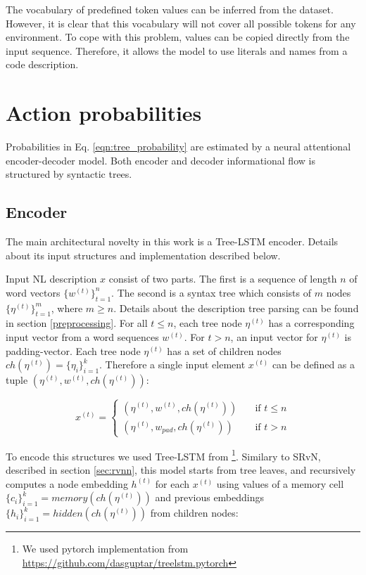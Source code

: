 The vocabulary of predefined token values can be inferred from the dataset. However, it is clear that this vocabulary will not cover all possible tokens for any environment. To cope with this problem, values can be copied directly from the input sequence. Therefore, it allows the model to use literals and names from a code description.

\section{Action probabilities}
Probabilities in Eq. \ref{eqn:tree_probability} are estimated by a neural attentional encoder-decoder model. Both encoder and decoder informational flow is structured by syntactic trees. 

\subsection{Encoder}
The main architectural novelty in this work is a Tree-LSTM encoder. Details about its input structures and implementation described below.

Input NL description $x$ consist of two parts. The first is a sequence of length $n$ of word vectors $\{w^{(t)}\}^n_{t=1}$. The second is a syntax tree which consists of $m$ nodes $\{\eta^{(t)}\}^m_{t=1}$, where $m\geq n$. Details about the description tree parsing can be found in section \ref{preprocessing}. For all $t \leq n$, each tree node $\eta^{(t)}$ has a corresponding input vector from a word sequences $w^{(t)}$. For $t > n$, an input vector for $\eta^{(t)}$ is padding-vector. Each tree node $\eta^{(t)}$ has a set of children nodes $ch(\eta^{(t)})=\{\eta_{i}\}^k_{i=1}$. Therefore a single input element $x^{(t)}$ can be defined as a tuple $(\eta^{(t)}, w^{(t)}, ch(\eta^{(t)}))$:

\begin{equation}
 x^{(t)} =
  \begin{cases}
    (\eta^{(t)}, w^{(t)}, ch(\eta^{(t)}))  & \quad \text{if } t\leq n\\
    (\eta^{(t)}, w_{pad}, ch(\eta^{(t)}))  & \quad \text{if } t > n
  \end{cases}
\label{eq:enc_input}
\end{equation}

To encode this structures we used Tree-LSTM from \cite{Tai2015}\footnote{We used pytorch implementation from \href{https://github.com/dasguptar/treelstm.pytorch}{https://github.com/dasguptar/treelstm.pytorch}}. Similary to SRvN, described in section \ref{sec:rvnn}, this model starts from tree leaves, and recursively computes a node embedding $h^{(t)}$ for each $x^{(t)}$ using values of a memory cell $\{c_i\}^{k}_{i=1} = memory(ch(\eta^{(t)}))$ and previous  embeddings $\{h_i\}^{k}_{i=1} = hidden(ch(\eta^{(t)}))$ from children nodes:

